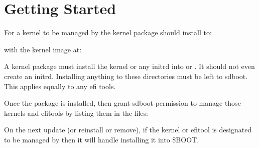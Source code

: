 \documentclass[letterpaper,11pt,english]{sphinxmanual}
\begin{document}
\section{Getting Started}
\label{\detokenize{Configuration:getting-started}}
\sphinxAtStartPar
For a kernel to be managed by  the kernel package should install to:

\begin{sphinxVerbatim}[commandchars=\\\{\}]
\end{sphinxVerbatim}

\sphinxAtStartPar
with the kernel image at:

\begin{sphinxVerbatim}[commandchars=\\\{\}]
\end{sphinxVerbatim}

\sphinxAtStartPar
A kernel package must  install the kernel or any initrd into  or .
It should not even create an initrd. Installing anything to these  directories
must be left to sd\sphinxhyphen{}boot. This applies equally to any efi tools.

\sphinxAtStartPar
Once the package is installed, then grant sd\sphinxhyphen{}boot permission to manage
those kernels and efi\sphinxhyphen{}tools by listing them in the files:

\begin{sphinxVerbatim}[commandchars=\\\{\}]
\end{sphinxVerbatim}

\sphinxAtStartPar
On the next update (or re\sphinxhyphen{}install or remove), if the kernel or efi\sphinxhyphen{}tool is designated
to be managed by  then it will handle installing it into \$BOOT.
\end{document}
